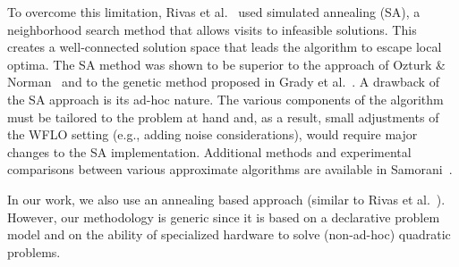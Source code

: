 \documentclass[preprint,12pt]{elsarticle}
\newcommand{\todo}[1]{{\textcolor{red}{\bf {#1}}}}
\begin{document}
To overcome this limitation, Rivas et al.\ \cite{rivas2009solving} used simulated annealing (SA), 
a neighborhood search method that allows visits to infeasible solutions. 
This creates a well-connected solution space that leads the algorithm to escape 
local optima. The SA method was shown to be superior to the approach of Ozturk \& Norman~\cite{ozturk2004heuristic} 
and to the genetic method proposed in Grady et al.\ \cite{grady2005placement}. A drawback of the SA approach 
is its ad-hoc nature. The various components of the algorithm
 must be tailored to the problem at hand and, as a result, small adjustments of the WFLO setting
 (e.g., adding noise considerations), would require major changes to the SA implementation. 
Additional methods and experimental comparisons between various approximate algorithms are available in Samorani~\cite{samorani2013wind}.

In our work, we also use an annealing based approach (similar to Rivas et al.\ \cite{rivas2009solving}). However,
our methodology is generic since it is based on a declarative problem model and
on the ability of specialized hardware to solve (non-ad-hoc) quadratic problems.




%
%
%
%
%
%
\end{document}
